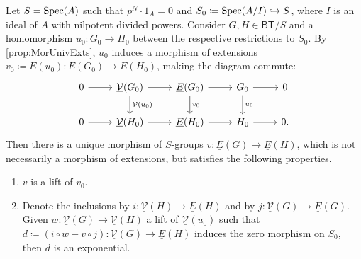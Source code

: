 \begin{thm}\label{thm:UniqueLiftingCrystals}
	Let $S = \operatorname{Spec}(A)$ such that $p^N \cdot 1_A = 0$ and
	$S_0 \coloneqq \operatorname{Spec}(A/I) \hookrightarrow S$, where $I$ is
	an ideal of $A$ with nilpotent divided powers.
	Consider $G, H \in \mathsf{BT}/S$ and a homomorphism
	$u_0\colon G_0 \to H_0$ between the respective restrictions to $S_0$.
	By \cref{prop:MorUnivExts}, $u_0$ induces
	a morphism of extensions $v_0 \coloneqq \underline{E}(u_0)\colon
	\underline{E}(G_0) \to \underline{E}(H_0)$,
	making the diagram commute:
	\begin{equation*}
	\begin{tikzcd}
		0 \arrow[r, "", rightarrow] &
		\underline{\mathcal{V}}(G_0) \arrow[d, "\underline{\mathcal{V}}(u_0)", rightarrow] 
		\arrow[r, "", rightarrow] &
		\underline{E}(G_0) \arrow[d, "v_0", rightarrow]
		\arrow[r, "", rightarrow] &
		G_0 \arrow[d, "u_0", rightarrow]
		\arrow[r, "", rightarrow] &
		0 \\
		0 \arrow[r, "", rightarrow] &
		\underline{\mathcal{V}}(H_0) \arrow[r, "", rightarrow] &
		\underline{E}(H_0) \arrow[r, "", rightarrow] &
		H_0 \arrow[r, "", rightarrow] &
		0
	.\end{tikzcd}
	\end{equation*}
	Then there is a unique morphism of $S$-groups
	$v\colon \underline{E}(G) \to \underline{E}(H)$, which is not necessarily a morphism
	of extensions, but satisfies the following properties.
\begin{enumerate}
	\item $v$ is a lift of $v_0$.

	\item Denote the inclusions by $i\colon \underline{\mathcal{V}}(H) \to \underline{E}(H)$ and by 
		$j\colon \underline{\mathcal{V}}(G) \to \underline{E}(G)$.
		Given $w\colon \underline{\mathcal{V}}(G) \to \underline{\mathcal{V}}(H)$
		a lift of $\underline{\mathcal{V}}(u_0)$
		such that $d\coloneqq (i \circ w - v \circ j)\colon
		\underline{\mathcal{V}}(G) \to \underline{E}(H)$
		induces the zero morphism on $S_0$, then $d$ is an exponential.
\end{enumerate}
\end{thm}



